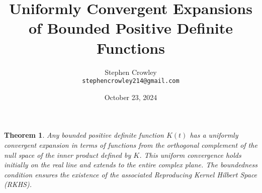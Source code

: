 \documentclass{article}
\newtheorem{theorem}{Theorem}
\begin{document}
\title{Uniformly Convergent Expansions of Bounded Positive Definite Functions}

\author{Stephen Crowley \\ \texttt{stephencrowley214@gmail.com}}
\date{October 23, 2024}

\maketitle

\begin{theorem}
  Any bounded positive definite function $K(t)$ has a uniformly convergent expansion 
  in terms of functions from the orthogonal complement of the null space of the 
  inner product defined by $K$. This uniform convergence holds initially on the 
  real line and extends to the entire complex plane. The boundedness condition 
  ensures the existence of the associated Reproducing Kernel Hilbert Space (RKHS).
\end{theorem}
\end{document}
